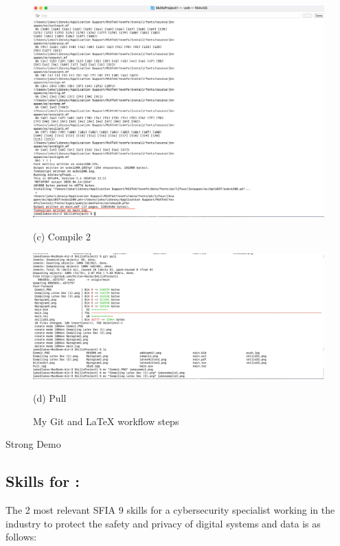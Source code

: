 \documentclass[a4paper, 11pt]{report}
\begin{document}
\begin{figure}[htbp]
\begin{minipage}[t]{0.45\textwidth}
\centering
\includegraphics[width=\linewidth]{jakecompile2.png}
\caption*{(c) Compile 2}
\end{minipage}
\hfill
\begin{minipage}[t]{0.45\textwidth}
\centering
\includegraphics[width=\linewidth]{jakepull.png}
\caption*{(d) Pull}
\end{minipage}

\caption{My Git and LaTeX workflow steps}
\end{figure}
\clearpage

Strong Demo

\subsection{Skills for \majD: \studD}

The 2 most relevant SFIA 9 skills \cite{sfia} for a cybersecurity specialist working in the industry to protect the safety and privacy of digital systems and data is as follows:
\end{document}
